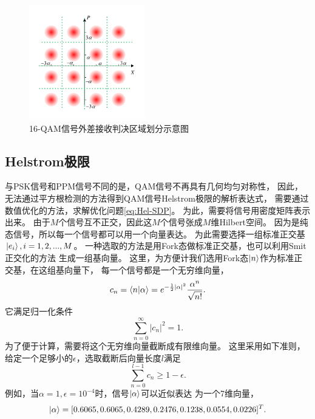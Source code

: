 \begin{figure}
\centering
  \includegraphics[height=5cm]{figures/chap3/QAM-domain-split}
  \caption{16-QAM信号外差接收判决区域划分示意图}
  \label{fig:QAM-domain-split}
\end{figure}

\subsection{Helstrom极限}
与PSK信号和PPM信号不同的是，QAM信号不再具有几何均匀对称性，
因此，无法通过平方根检测的方法得到QAM信号Helstrom极限的解析表达式，
需要通过数值优化的方法，求解优化问题\ref{eq:Hel-SDP}。
为此，需要将信号用密度矩阵表示出来。
由于$M$个信号互不正交，因此这$M$个信号张成$M$维Hilbert空间。
因为是纯态信号，所以每一个信号都可以用一个向量表达。
为此需要选择一组标准正交基$\ket{e_i}, i=1,2,...,M$。
一种选取的方法是用Fork态做标准正交基，也可以利用Smit正交化的方法
生成一组基向量\cite{zxd2004matrix}。
这里，为方便计我们选用Fork态$\ket{n}$作为标准正交基，在这组基向量下，
每一个信号都是一个无穷维向量，
\begin{equation}
c_n = \bra{n}\ket{\alpha} = e^{-\frac{1}{2}|\alpha|^2} \frac{\alpha^n}{\sqrt{n!}}.
\end{equation}
它满足归一化条件
\begin{equation}
\sum_{n=0}^{\infty} |c_n|^2 = 1.
\end{equation}
为了便于计算，需要将这个无穷维向量截断成有限维向量。
这里采用如下准则，给定一个足够小的$\epsilon$，选取截断后向量长度$l$满足
\begin{equation}
\sum_{n=0}^{l-1} c_n \ge 1 - \epsilon.
\label{eq:epsilon-criterion}
\end{equation}
例如，当$\alpha=1, \epsilon=10^{-4}$时，信号$\ket{\alpha}$可以近似表达
为一个7维向量，
\begin{equation}
\ket{\alpha} = [0.6065, \\
    0.6065, \\
    0.4289, \\
    0.2476, \\
    0.1238, \\
    0.0554, \\
    0.0226]^T.
\end{equation}
